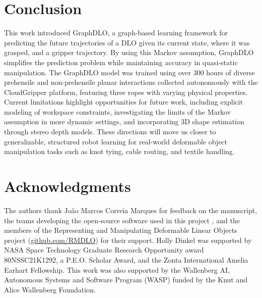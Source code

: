\documentclass[letterpaper, 10 pt, conference]{IEEETran}
\begin{document}
\section{Conclusion} 
\label{sec:conclusion}

This work introduced GraphDLO, a graph-based learning framework for predicting the future trajectories of a DLO given its current state, where it was grasped, and a gripper trajectory. By using this Markov assumption, GraphDLO simplifies the prediction problem while maintaining accuracy in quasi-static manipulation. The GraphDLO model was trained using over 300 hours of diverse prehensile and non-prehensile planar interactions collected autonomously with the CloudGripper platform, featuring three ropes with varying physical properties. Current limitations highlight opportunities for future work, including explicit modeling of workspace constraints, investigating the limits of the Markov assumption in more dynamic settings, and incorporating 3D shape estimation through stereo depth models. These directions will move us closer to generalizable, structured robot learning for real-world deformable object manipulation tasks such as knot tying, cable routing, and textile handling.

\newpage

\section*{Acknowledgments}

\noindent \small The authors thank João Marcos Correia Marques for feedback on the manuscript, the teams developing the open-source software used in this project \cite{opencv_library, harris2020numpy, hunter2007matplotlib, virtanen2020scipy, paszke2019pytorch}, and the members of the Representing and Manipulating Deformable Linear Objects project (\href{https://github.com/RMDLO}{github.com/RMDLO}) for their support. Holly Dinkel was supported by NASA Space Technology Graduate Research Opportunity award 80NSSC21K1292, a P.E.O. Scholar Award, and the Zonta International Amelia Earhart Fellowship. This work was also supported by the Wallenberg AI, Autonomous Systems and Software Program (WASP) funded by the Knut and Alice Wallenberg Foundation.



\end{document}
